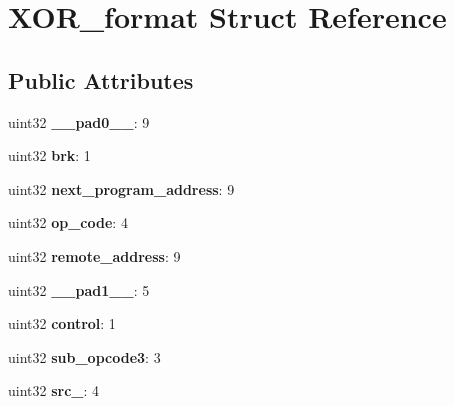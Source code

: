 \hypertarget{structXOR__format}{}\section{X\+O\+R\+\_\+format Struct Reference}
\label{structXOR__format}
\subsection*{Public Attributes}
\begin{DoxyCompactItemize}
\item 
\mbox{\label{structXOR__format_a65f03407c4b6073c1bdf7c15c061898e}} 
uint32 {\bfseries \+\_\+\+\_\+pad0\+\_\+\+\_\+}\+: 9
\item 
\mbox{\label{structXOR__format_a91e1dea0b3903f4e599c4708361e6bca}} 
uint32 {\bfseries brk}\+: 1
\item 
\mbox{\label{structXOR__format_a546b50b032a3fa4441e08e5fbe53b3b3}} 
uint32 {\bfseries next\+\_\+program\+\_\+address}\+: 9
\item 
\mbox{\label{structXOR__format_a764a3afc5e856d24441f1d5e55a1d950}} 
uint32 {\bfseries op\+\_\+code}\+: 4
\item 
\mbox{\label{structXOR__format_a013d07a7004f6bb22b84c541035980a4}} 
uint32 {\bfseries remote\+\_\+address}\+: 9
\item 
\mbox{\label{structXOR__format_ade5a1f842a7d4d98c5822373e9db1a54}} 
uint32 {\bfseries \+\_\+\+\_\+pad1\+\_\+\+\_\+}\+: 5
\item 
\mbox{\label{structXOR__format_a37340b3089b1fd4915dc242fe43d053d}} 
uint32 {\bfseries control}\+: 1
\item 
\mbox{\label{structXOR__format_aa32c29bb939cc657b2e0e4aec0749336}} 
uint32 {\bfseries sub\+\_\+opcode3}\+: 3
\item 
\mbox{\label{structXOR__format_ad43b9bc27c9d2e8be01d977578d49eab}} 
uint32 {\bfseries src\+\_}\+: 4
\item 

\end{DoxyCompactItemize}
